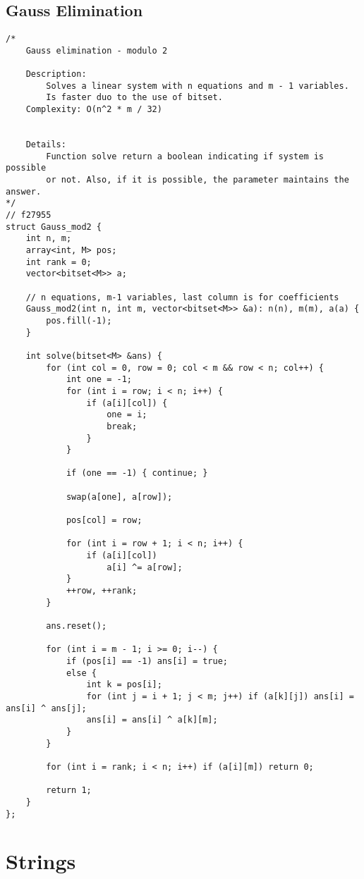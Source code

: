 \documentclass{article}
\begin{document}
\subsection{Gauss Elimination}
\begin{verbatim}
/*
    Gauss elimination - modulo 2

    Description: 
        Solves a linear system with n equations and m - 1 variables.
        Is faster duo to the use of bitset.
    Complexity: O(n^2 * m / 32)


    Details:
        Function solve return a boolean indicating if system is possible
        or not. Also, if it is possible, the parameter maintains the answer.
*/
// f27955
struct Gauss_mod2 {
    int n, m;
    array<int, M> pos;
    int rank = 0;
    vector<bitset<M>> a;
 
    // n equations, m-1 variables, last column is for coefficients
    Gauss_mod2(int n, int m, vector<bitset<M>> &a): n(n), m(m), a(a) {
        pos.fill(-1);
    }
 
    int solve(bitset<M> &ans) {
        for (int col = 0, row = 0; col < m && row < n; col++) {
            int one = -1;
            for (int i = row; i < n; i++) {
                if (a[i][col]) {
                    one = i;
                    break;
                }
            }
 
            if (one == -1) { continue; }
 
            swap(a[one], a[row]);
 
            pos[col] = row;
 
            for (int i = row + 1; i < n; i++) {
                if (a[i][col])
                    a[i] ^= a[row];
            }
            ++row, ++rank;
        }
 
        ans.reset();
 
        for (int i = m - 1; i >= 0; i--) {
            if (pos[i] == -1) ans[i] = true;
            else {
                int k = pos[i];
                for (int j = i + 1; j < m; j++) if (a[k][j]) ans[i] = ans[i] ^ ans[j];
                ans[i] = ans[i] ^ a[k][m];
            }
        }
 
        for (int i = rank; i < n; i++) if (a[i][m]) return 0;
 
        return 1;
    }
};
\end{verbatim}
\section{Strings}
\end{document}
